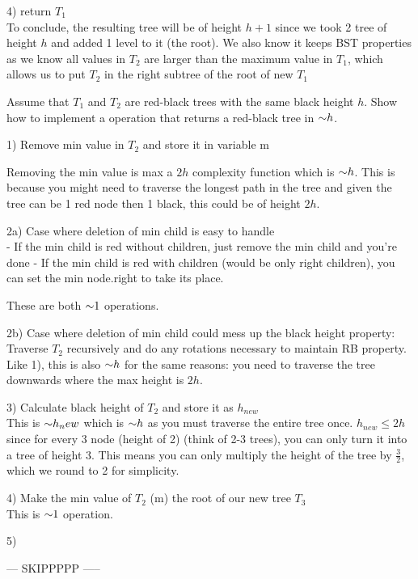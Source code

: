 \begin{problem}
\begin{questions}
4) return $T_1$\\

To conclude, the resulting tree will be of height $h+1$ since we took 2 tree of height $h$ and added 1 level to it (the root). We also know it keeps BST properties as we know all values in $T_2$ are larger than the maximum value in $T_1$, which allows us to put $T_2$ in the right subtree of the root of new $T_1$

\item Assume that $T_1$ and $T_2$ are red-black trees with the same black height $h$. Show how to implement a  operation that returns a red-black tree in $\mathord{\sim}h$.

1) Remove min value in $T_2$ and store it in variable m

Removing the min value is max a $2h$ complexity function which is $\mathord{\sim}h$. This is because you might need to traverse the longest path in the tree and given the tree can be 1 red node then 1 black, this could be of height $2h$.

2a) Case where deletion of min child is easy to handle\\
- If the min child is red without children, just remove the min child and you're done
- If the min child is red with children (would be only right children), you can set the min node.right to take its place. 

These are both $\mathord{\sim}1$ operations.

2b) Case where deletion of min child could mess up the black height property: Traverse $T_2$ recursively and do any rotations necessary to maintain RB property.\\
Like 1), this is also $\mathord{\sim}h$ for the same reasons: you need to traverse the tree downwards where the max height is $2h$.

3) Calculate black height of $T_2$ and store it as $h_{new}$\\
This is $\mathord{\sim}h_new$ which is $\mathord{\sim}h$ as you must traverse the entire tree once. $h_{new} \leq 2h$ since for every 3 node (height of 2) (think of 2-3 trees), you can only turn it into a tree of height 3. This means you can only multiply the height of the tree by $\frac{3}{2}$, which we round to 2 for simplicity. 

4) Make the min value of $T_2$ (m) the root of our new tree $T_3$\\
This is $\mathord{\sim}1$ operation.

5) 


--- SKIPPPPP -----


\end{questions}
\end{problem}
